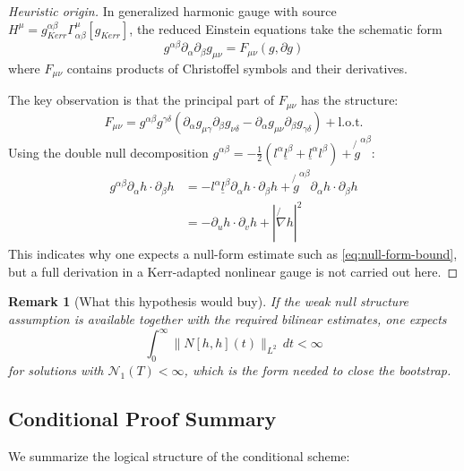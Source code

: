 \documentclass[12pt,a4paper]{article}
\newtheorem{remark}[theorem]{Remark}
\newcommand{\slashed}[1]{\not{#1}}
\begin{document}
\begin{proof}[Heuristic origin]
In generalized harmonic gauge with source $H^\mu = g_{Kerr}^{\alpha\beta}\Gamma^\mu_{\alpha\beta}[g_{Kerr}]$, the reduced Einstein equations take the schematic form
\begin{equation}
g^{\alpha\beta} \partial_\alpha \partial_\beta g_{\mu\nu} = F_{\mu\nu}(g, \partial g)
\end{equation}
where $F_{\mu\nu}$ contains products of Christoffel symbols and their derivatives.

The key observation is that the principal part of $F_{\mu\nu}$ has the structure:
\begin{equation}
F_{\mu\nu} = g^{\alpha\beta}g^{\gamma\delta}(\partial_\alpha g_{\mu\gamma}\partial_\beta g_{\nu\delta} - \partial_\alpha g_{\mu\nu} \partial_\beta g_{\gamma\delta}) + \text{l.o.t.}
\end{equation}
Using the double null decomposition $g^{\alpha\beta} = -\frac{1}{2}(l^\alpha \underline{l}^\beta + \underline{l}^\alpha l^\beta) + \slashed{g}^{\alpha\beta}$:
\begin{align}
g^{\alpha\beta}\partial_\alpha h \cdot \partial_\beta h &= -l^\alpha \underline{l}^\beta \partial_\alpha h \cdot \partial_\beta h + \slashed{g}^{\alpha\beta}\partial_\alpha h \cdot \partial_\beta h \\
&= -\partial_u h \cdot \partial_v h + |\slashed{\nabla} h|^2
\end{align}
This indicates why one expects a null-form estimate such as \eqref{eq:null-form-bound}, but a full derivation in a Kerr-adapted nonlinear gauge is not carried out here.
\end{proof}

\begin{remark}[What this hypothesis would buy]
If the weak null structure assumption is available together with the required bilinear estimates, one expects
\begin{equation}
\int_0^\infty \|N[h, h](t)\|_{L^2} \, dt < \infty
\end{equation}
for solutions with $\mathcal{N}_1(T) < \infty$, which is the form needed to close the bootstrap.
\end{remark}

\subsection{Conditional Proof Summary}

We summarize the logical structure of the conditional scheme:
\end{document}

